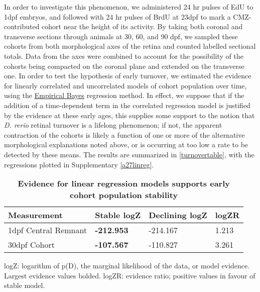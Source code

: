 In order to investigate this phenomenon, we administered 24 hr pulses of EdU to 1dpf embryos, and followed with 24 hr pulses of BrdU at 23dpf to mark a CMZ-contributed cohort near the height of its activity. By taking both coronal and transverse sections through animals at 30, 60, and 90 dpf, we sampled these cohorts from both morphological axes of the retina and counted labelled sectional totals. Data from the axes were combined to account for the possibility of the cohorts being compacted on the coronal plane and extended on the transverse one. In order to test the hypothesis of early turnover, we estimated the evidence for linearly correlated and uncorrelated models of cohort population over time, using the \hyperref[empiricalBayes]{Empirical Bayes} regression method. In effect, we suppose that if the addition of a time-dependent term in the correlated regression model is justified by the evidence at these early ages, this supplies some support to the notion that \textit{D. rerio} retinal turnover is a lifelong phenomenon; if not, the apparent contraction of the cohorts is likely a function of one or more of the alternative morphological explanations noted above, or is occurring at too low a rate to be detected by these means. The results are summarized in \autoref{turnovertable}, with the regressions plotted in Supplementary \autoref{a27linreg}.

\begin{table}[!ht]
    \centering
    \caption{{\bf Evidence for linear regression models supports early cohort population stability}}
    \begin{tabular}{|l|l|l|l|}
    \hline
    {\bf Measurement} & {\bf Stable logZ} & {\bf Declining logZ} & {\bf logZR}\\ \hline
    1dpf Central Remnant & {\bf -212.953} & -214.167 & 1.213\\ \hline    
    30dpf Cohort & {\bf -107.567} & -110.827 & 3.261\\ \hline
    \end{tabular}
   
    \begin{flushleft}logZ: logarithm of p(D), the marginal likelihood of the data, or model evidence.  Largest evidence values bolded. logZR: evidence ratio; positive values in favour of stable model.
    \end{flushleft}
    \label{turnovertable}
\end{table}

